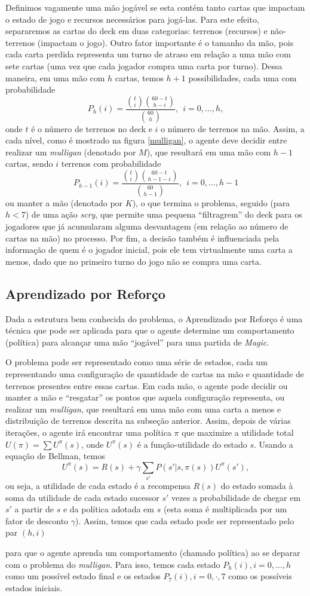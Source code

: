 \documentclass{book}
\begin{document}
Definimos vagamente uma mão jogável se esta contém tanto cartas que impactam o estado de jogo e recursos necessários para jogá-las.
Para este efeito, separaremos as cartas do deck em duas categorias: terrenos (recursos) e não-terrenos (impactam o jogo).
Outro fator importante é o tamanho da mão, pois cada carta perdida representa um turno de atraso em relação a uma mão com sete cartas (uma vez que cada jogador compra
uma carta por turno). Dessa maneira, em uma mão com $h$ cartas, temos $h+1$ possibilidades, cada uma com probabilidade
\[ P_h(i) = \frac{\binom{t}{i}\binom{60 - t}{h - i}}{\binom{60}{h}}, \ \ i = 0,\ldots, h,\] onde $t$ é o número de terrenos no deck e $i$ o número de terrenos
na mão. Assim, a cada nível, como é mostrado na figura \ref{mulligan}, o agente deve decidir entre realizar um \textit{mulligan}
(denotado por $M$), que resultará em uma mão com $h-1$ cartas, sendo $i$ terrenos com probabilidade
 \[ P_{h - 1}(i) = \frac{\binom{t}{i}\binom{60 - t}{h - 1 - i}}{\binom{60}{h - 1}}, \ \  i = 0,\ldots, h - 1\]
 ou manter a mão (denotado por $K$), o que termina o problema, seguido (para $h < 7$) de uma ação \textit{scry}, que permite uma pequena ``filtragrem''
 do deck para os jogadores que já acumularam alguma desvantagem (em relação ao número de cartas na mão) no processo. Por fim, a decisão também é influenciada
 pela informação de quem é o jogador inicial, pois ele tem virtualmente uma carta a menos, dado que no primeiro turno do jogo não se compra uma carta.

\subsection{Aprendizado por Reforço}


Dada a estrutura bem conhecida do problema, o Aprendizado por Reforço é uma técnica que pode ser aplicada
para que o agente determine um comportamento (política) para alcançar uma mão ``jogável'' para uma partida de \textit{Magic}.

O problema pode ser representado como uma série de estados, cada um representando uma configuração de quantidade de cartas na mão
e quantidade de terrenos presentes entre essas cartas. Em cada mão, o agente pode decidir ou manter a mão e ``resgatar''
os pontos que aquela configuração representa, ou realizar um \textit{mulligan}, que resultará em uma mão com uma carta a menos e
distribuição de terrenos descrita na subseção anterior. Assim, depois de várias iterações, o agente irá encontrar uma política $\pi$
que maximize a utilidade total $U(\pi) = \sum U^\pi(s)$, onde $U^\pi(s)$ é a função-utilidade do estado $s$. Usando a equação de
Bellman, temos \[ U^\pi(s) = R(s) + \gamma\sum\limits_{s'}P(s' | s, \pi(s))U^\pi(s'),\] ou seja, a utilidade de cada estado é a recompensa $R(s)$
do estado somada à soma da utilidade de cada estado sucessor $s'$ vezes a probabilidade de chegar em $s'$ a partir de $s$ e da política adotada
em $s$ (esta soma é multiplicada por um fator de desconto $\gamma$). Assim, temos que cada estado pode ser representado pelo par $(h, i)$ 

 para que o agente aprenda
um comportamento (chamado política) ao se deparar com o problema do \textit{mulligan}.
Para isso, temos cada estado $P_h(i), i = 0,\ldots, h$ como um possível estado final e
os estados $P_7(i), i = 0,\cdot, 7$ como os possíveis estados iniciais.
\end{document}
